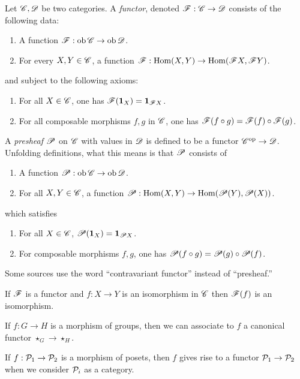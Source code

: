Let $\mathscr{C}, \mathscr{D}$ be two categories.
A \emph{functor}, denoted $\mathscr{F} : \mathscr{C} \to \mathscr{D}$ consists of the following data:
\begin{enumerate}
  \item A function $\mathscr{F} : \operatorname{ob} \mathscr{C} \to \operatorname{ob} \mathscr{D}$.
  \item For every $X,Y \in \mathscr{C}$, a function $\mathscr{F} : \operatorname{Hom}(X,Y) \to \operatorname{Hom}(\mathscr{F} X, \mathscr{F} Y)$.
\end{enumerate}
and subject to the following axioms:
\begin{enumerate}
  \item For all $X \in \mathscr{C}$, one has $\mathscr{F}(\mathbf{1}_{X}) = \mathbf{1}_{\mathscr{F} X}$.
  \item For all composable morphisms $f,g$ in $\mathscr{C}$, one has $\mathscr{F}(f \circ g) = \mathscr{F}(f) \circ \mathscr{F}(g)$.
\end{enumerate}

A \emph{presheaf} $\mathscr{P}$ on $\mathscr{C}$ with values in $\mathscr{D}$ is defined to be a functor $\mathscr{C}^{\mathrm{op}} \to \mathscr{D}$.
Unfolding definitions, what this means is that $\mathscr{P}$ consists of
\begin{enumerate}
  \item A function $\mathscr{P} : \operatorname{ob}\mathscr{C} \to \operatorname{ob} \mathscr{D}$.
  \item For all $X,Y \in \mathscr{C}$, a function $\mathscr{P} : \operatorname{Hom}(X,Y) \to \operatorname{Hom}(\mathscr{P}(Y),\mathscr{P}(X))$.
\end{enumerate}
which satisfies
\begin{enumerate}
  \item For all $X \in \mathscr{C}$, $\mathscr{P}(\mathbf{1}_{X}) = \mathbf{1}_{\mathscr{P} X}$.
  \item For composable morphisms $f,g$, one has $\mathscr{P}(f \circ g) = \mathscr{P}(g) \circ \mathscr{P}(f)$.
\end{enumerate}
Some sources use the word ``contravariant functor'' instead of ``presheaf.''

\begin{exercise}
  If $\mathscr{F}$ is a functor and $f : X \to Y$ is an isomorphism in $\mathscr{C}$ then $\mathscr{F}(f)$ is an isomorphism.
\end{exercise}

\begin{example}
  If $f : G \to H$ is a morphism of groups, then we can associate to $f$ a canonical functor $\star_{G} \to \star_{H}$.
\end{example}

\begin{example}
  If $f : \mathcal{P}_{1} \to \mathcal{P}_{2}$ is a morphism of posets, then $f$ gives rise to a functor $\mathcal{P}_{1} \to \mathcal{P}_{2}$ when we consider $\mathcal{P}_{i}$ as a category.
\end{example}

